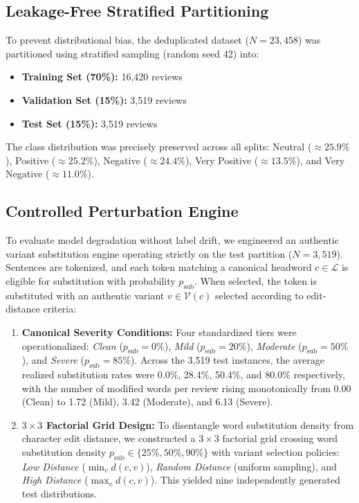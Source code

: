 \subsection{Leakage-Free Stratified Partitioning}
To prevent distributional bias, the deduplicated dataset ($N=23,458$) was partitioned using stratified sampling (random seed 42) into:
\begin{itemize}
    \item \textbf{Training Set (70\%):} 16,420 reviews
    \item \textbf{Validation Set (15\%):} 3,519 reviews
    \item \textbf{Test Set (15\%):} 3,519 reviews
\end{itemize}
The class distribution was precisely preserved across all splits: Neutral ($\approx 25.9\%$), Positive ($\approx 25.2\%$), Negative ($\approx 24.4\%$), Very Positive ($\approx 13.5\%$), and Very Negative ($\approx 11.0\%$).

\subsection{Controlled Perturbation Engine}
To evaluate model degradation without label drift, we engineered an authentic variant substitution engine operating strictly on the test partition ($N=3,519$). Sentences are tokenized, and each token matching a canonical headword $c \in \mathcal{L}$ is eligible for substitution with probability $p_{\text{sub}}$. When selected, the token is substituted with an authentic variant $v \in \mathcal{V}(c)$ selected according to edit-distance criteria:
\begin{enumerate}
    \item \textbf{Canonical Severity Conditions:} Four standardized tiers were operationalized: \textit{Clean} ($p_{\text{sub}} = 0\%$), \textit{Mild} ($p_{\text{sub}} = 20\%$), \textit{Moderate} ($p_{\text{sub}} = 50\%$), and \textit{Severe} ($p_{\text{sub}} = 85\%$). Across the 3,519 test instances, the average realized substitution rates were 0.0\%, 28.4\%, 50.4\%, and 80.0\% respectively, with the number of modified words per review rising monotonically from 0.00 (Clean) to 1.72 (Mild), 3.42 (Moderate), and 6.13 (Severe).
    \item \textbf{$3 \times 3$ Factorial Grid Design:} To disentangle word substitution density from character edit distance, we constructed a $3 \times 3$ factorial grid crossing word substitution density $p_{\text{sub}} \in \{25\%, 50\%, 90\%\}$ with variant selection policies: \textit{Low Distance} ($\min_{v} d(c,v)$), \textit{Random Distance} (uniform sampling), and \textit{High Distance} ($\max_{v} d(c,v)$). This yielded nine independently generated test distributions.
\end{enumerate}

